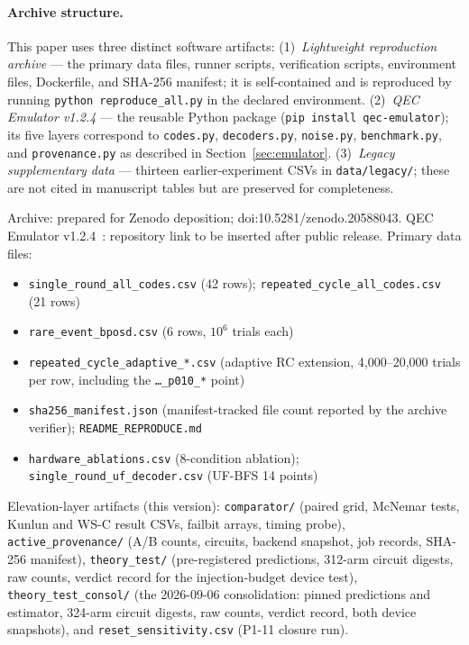 \documentclass[11pt,a4paper]{article}
\begin{document}
\paragraph{Archive structure.}
This paper uses three distinct software artifacts:
(1)~\emph{Lightweight reproduction archive} --- the primary data files, runner scripts, verification scripts, environment files, Dockerfile, and SHA-256 manifest; it is self-contained and is reproduced by running \texttt{python reproduce\_all.py} in the declared environment.
(2)~\emph{QEC Emulator v1.2.4} --- the reusable Python package (\texttt{pip install qec-emulator});
its five layers correspond to \texttt{codes.py}, \texttt{decoders.py}, \texttt{noise.py},
\texttt{benchmark.py}, and \texttt{provenance.py} as described in Section~\ref{sec:emulator}.
(3)~\emph{Legacy supplementary data} --- thirteen earlier-experiment CSVs
in \texttt{data/legacy/}; these are not cited in manuscript tables but are
preserved for completeness.

Archive: prepared for Zenodo deposition; doi:10.5281/zenodo.20588043.
QEC Emulator v1.2.4~\cite{AlDaajeh2026emulator}: repository link
to be inserted after public release.
Primary data files:
\begin{itemize}[leftmargin=1.4em,itemsep=0pt,topsep=2pt]
  \item \texttt{single\_round\_all\_codes.csv} (42 rows);
        \texttt{repeated\_cycle\_all\_codes.csv} (21 rows)
  \item \texttt{rare\_event\_bposd.csv} (6 rows, $10^{6}$ trials each)
  \item \texttt{repeated\_cycle\_adaptive\_*.csv} (adaptive RC extension,
        4{,}000--20{,}000 trials per row, including the
        \texttt{\dots\_p010\_*} point)
  \item \texttt{sha256\_manifest.json} (manifest-tracked file count
        reported by the archive verifier); \texttt{README\_REPRODUCE.md}
  \item \texttt{hardware\_ablations.csv} (8-condition ablation);
        \texttt{single\_round\_uf\_decoder.csv} (UF-BFS 14 points)
\end{itemize}
Elevation-layer artifacts (this version):
\texttt{comparator/} (paired grid, McNemar tests, Kunlun and WS-C
result CSVs, failbit arrays, timing probe),
\texttt{active\_provenance/} (A/B counts, circuits, backend snapshot,
job records, SHA-256 manifest),
\texttt{theory\_test/} (pre-registered predictions, 312-arm circuit
digests, raw counts, verdict record for the injection-budget device
test), \texttt{theory\_test\_consol/} (the 2026-09-06 consolidation:
pinned predictions and estimator, 324-arm circuit digests, raw counts,
verdict record, both device snapshots), and
\texttt{reset\_sensitivity.csv} (P1-11 closure run).
\end{document}
